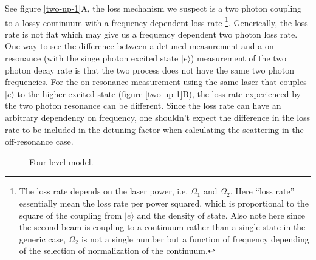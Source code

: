 \documentclass[10pt,fleqn]{article}
\begin{document}
See figure \ref{two-up-1}A, the loss mechanism we suspect is a two photon coupling
to a lossy continuum with a frequency dependent loss rate
\footnote{The loss rate depends on the laser power, i.e. $\Omega_1$ and $\Omega_2$. Here
  ``loss rate'' essentially mean the loss rate per power squared, which is proportional to
  the square of the coupling from $|e\rangle$ and the density of state.
  Also note here since the second beam is coupling to a continuum rather than a single state
  in the generic case, $\Omega_2$ is not a single number but a function of frequency
  depending of the selection of normalization of the continuum.}.
Generically, the loss rate is not flat which may give us a frequency dependent
two photon loss rate. One way to see the difference between a detuned measurement
and a on-resonance (with the singe photon excited state $|e\rangle$)
measurement of the two photon decay rate is that the two process does not have the same
two photon frequencies. For the on-resonance measurement using the same laser that couples
$|e\rangle$ to the higher excited state (figure \ref{two-up-1}B),
the loss rate experienced by the two photon resonance can be different.
Since the loss rate can have an arbitrary dependency on frequency, one shouldn't expect
the difference in the loss rate to be included in the detuning factor when calculating
the scattering in the off-resonance case.\\

\begin{wrapfigure}{R}{5cm}
  \begin{center}
  \end{center}
  \caption{Four level model.}
  \label{two-up-2}
\end{wrapfigure}
\end{document}
